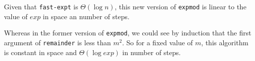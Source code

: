 \documentclass[a4paper,12pt]{article}
\begin{document}
Given that \lstinline!fast-expt! is $\Theta(\log n)$, this new
version of \lstinline!expmod! is linear to the value of $exp$ in space
an number of steps.

Whereas in the former version of \lstinline!expmod!, we could see by
induction that the first argument of \lstinline!remainder! is less than
$m^2$.  So for a fixed value of $m$, this algorithm is constant in
space and $\Theta(\log exp)$ in number of steps.
\end{document}
